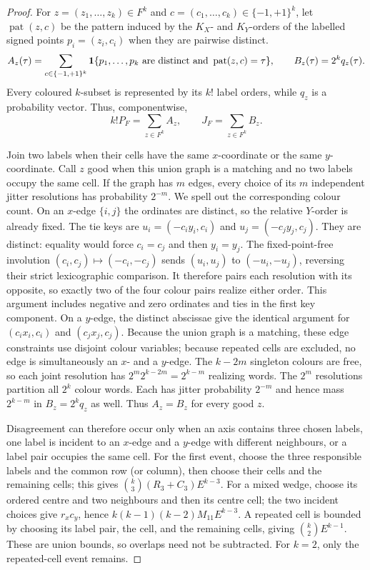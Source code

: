 \documentclass[11pt,letterpaper]{article}
\begin{document}
\begin{proof}
For $z=(z_1,\ldots,z_k)\in F^k$ and
$c=(c_1,\ldots,c_k)\in\{-1,+1\}^k$, let
$\operatorname{pat}(z,c)$ be the pattern induced by the
$K_X$- and $K_Y$-orders of the labelled signed points
$p_i=(z_i,c_i)$ when they are pairwise distinct.
\[
 A_z(\tau)=\sum_{c\in\{-1,+1\}^k}
 {\bf1}\{p_1,\ldots,p_k\text{ are distinct and }
             \operatorname{pat}(z,c)=\tau\},
 \qquad B_z(\tau)=2^kq_z(\tau).
\]
Every coloured $k$-subset is represented by its $k!$ label orders, while
$q_z$ is a probability vector.  Thus, componentwise,
\[
 k!P_F=\sum_{z\in F^k}A_z,
 \qquad J_F=\sum_{z\in F^k}B_z.
\]

Join two labels when their cells have the same $x$-coordinate or the same
$y$-coordinate.  Call $z$ good when this union graph is a matching and no
two labels occupy the same cell.  If the graph has $m$ edges, every choice
of its $m$ independent jitter resolutions has probability $2^{-m}$.  We
spell out the corresponding colour count.  On an $x$-edge $\{i,j\}$ the
ordinates are distinct, so the relative $Y$-order is already fixed.
The tie keys are $u_i=(-c_i y_i,c_i)$ and $u_j=(-c_j y_j,c_j)$.
They are distinct: equality would force $c_i=c_j$ and then $y_i=y_j$.
The fixed-point-free involution $(c_i,c_j)\mapsto(-c_i,-c_j)$ sends
$(u_i,u_j)$ to $(-u_i,-u_j)$, reversing their strict lexicographic
comparison.  It therefore pairs each resolution with its opposite, so
exactly two of the four colour pairs realize either order.  This argument
includes negative and zero ordinates and ties in the first key component.
On a $y$-edge, the distinct abscissae give the identical argument for
$(c_i x_i,c_i)$ and $(c_j x_j,c_j)$.  Because the union graph is a matching, these
edge constraints use disjoint colour variables; because repeated cells are
excluded, no edge is simultaneously an $x$- and a $y$-edge.  The $k-2m$ singleton colours are free, so each joint resolution has
$2^m2^{k-2m}=2^{k-m}$ realizing words.  The $2^m$ resolutions partition
all $2^k$ colour words.  Each has jitter probability $2^{-m}$ and hence
mass $2^{k-m}$ in $B_z=2^kq_z$ as well.  Thus $A_z=B_z$ for every good $z$.

Disagreement can therefore occur only when an axis contains three chosen
labels, one label is incident to an $x$-edge and a $y$-edge with different
neighbours, or a label pair occupies the same cell.  For the first event,
choose the three responsible labels and the common row (or column), then
choose their cells and the remaining cells; this gives
$\binom{k}{3}(R_3+C_3)E^{k-3}$.  For a mixed wedge, choose its ordered
centre and two neighbours and then its centre cell; the two incident
choices give $r_xc_y$, hence
$k(k-1)(k-2)M_{11}E^{k-3}$.  A repeated cell is bounded by choosing its
label pair, the cell, and the remaining cells, giving
$\binom{k}{2}E^{k-1}$.  These are union bounds, so overlaps need not be
subtracted.  For $k=2$, only the repeated-cell event remains.


\end{proof}
\end{document}
